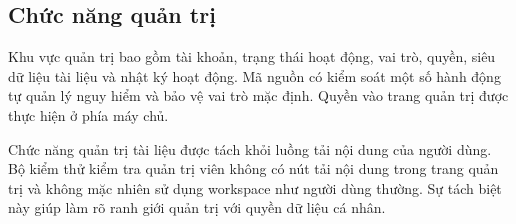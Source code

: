 \subsection{Chức năng quản trị}
Khu vực quản trị bao gồm tài khoản, trạng thái hoạt động, vai trò, quyền, siêu dữ liệu tài liệu và nhật ký hoạt động. Mã nguồn có kiểm soát một số hành động tự quản lý nguy hiểm và bảo vệ vai trò mặc định. Quyền vào trang quản trị được thực hiện ở phía máy chủ.

Chức năng quản trị tài liệu được tách khỏi luồng tải nội dung của người dùng. Bộ kiểm thử kiểm tra quản trị viên không có nút tải nội dung trong trang quản trị và không mặc nhiên sử dụng workspace như người dùng thường. Sự tách biệt này giúp làm rõ ranh giới quản trị với quyền dữ liệu cá nhân.

